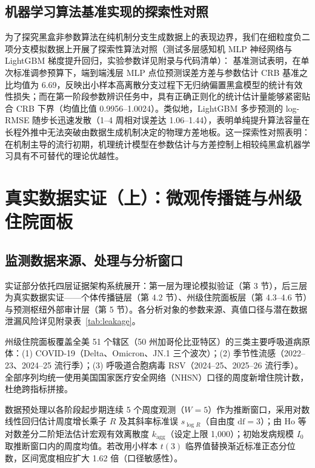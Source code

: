 \documentclass[11pt,a4paper]{article}
\theoremstyle{plain}
\theoremstyle{definition}
\begin{document}



\subsection{机器学习算法基准实现的探索性对照}\label{sec:ml}

为了探究黑盒非参数算法在纯机制分支生成数据上的表现边界，我们在细粒度负二项分支模拟数据上开展了探索性算法对照（测试多层感知机 MLP 神经网络与 LightGBM 梯度提升回归，实验参数详见附录与代码清单）：
基准测试表明，在单次标准调参预算下，端到端浅层 MLP 点位预测误差方差与参数估计 CRB 基准之比均值为 6.69，反映出小样本高离散分支过程下无归纳偏置黑盒模型的统计有效性损失；而在第一阶段参数辨识任务中，具有正确正则化的统计估计量能够紧密贴合 CRB 下界（均值比值 0.9956--1.0024）。类似地，LightGBM 多步预测的 log-RMSE 随步长迅速发散（1--4 周相对误差达 1.06--1.44），表明单纯提升算法容量在长程外推中无法突破由数据生成机制决定的物理方差地板。这一探索性对照表明：在机制主导的流行初期，机理统计模型在参数估计与方差控制上相较纯黑盒机器学习具有不可替代的理论优越性。

\section{真实数据实证（上）：微观传播链与州级住院面板}\label{sec:empirical}

\subsection{监测数据来源、处理与分析窗口}\label{sec:data}

实证部分依托四层证据架构系统展开：第一层为理论模拟验证（第 3 节），后三层为真实数据实证——个体传播链层（第 4.2 节）、州级住院面板层（第 4.3--4.6 节）与预测枢纽外部审计层（第 5 节）。各分析对象的参数来源、真值口径与潜在数据泄漏风险详见附录表~\ref{tab:leakage}。

州级住院面板覆盖全美 51 个辖区（50 州加哥伦比亚特区）的三类主要呼吸道病原体：(1) COVID-19（Delta、Omicron、JN.1 三个波次）；(2) 季节性流感（2022--23、2024--25 流行季）；(3) 呼吸道合胞病毒 RSV（2024--25、2025--26 流行季）。全部序列均统一使用美国国家医疗安全网络（NHSN）口径的周度新增住院计数，杜绝跨指标拼接。

数据预处理以各阶段起步期连续 5 个周度观测（$W=5$）作为推断窗口，采用对数线性回归估计周度增长乘子 $R$ 及其斜率标准误 $s_{\log R}$（自由度 $\text{df}=3$）；由 Ho 等\citep{ho2023simultaneous} 对数差分二阶矩法估计宏观有效离散度 $k_{\text{agg}}$（设定上限 1,000）；初始发病规模 $I_0$ 取推断窗口内的周度均值。若改用小样本 $t(3)$ 临界值替换渐近标准正态分位数，区间宽度相应扩大 1.62 倍（口径敏感性）。
\end{document}
